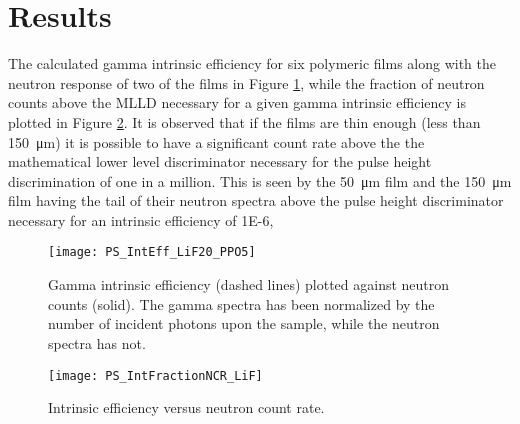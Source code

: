 \documentclass[draftcls,onecolumn]{IEEEtran}
\begin{document}
\section{Results}
\label{sec:Results}
The calculated gamma intrinsic efficiency for six polymeric films along with the neutron response of two of the films in Figure \ref{fig:GammaIntrNeutronCounts}, while the fraction of neutron counts above the MLLD necessary for a given gamma intrinsic efficiency is plotted in Figure \ref{fig:crVsIntEff}.
It is observed that if the films are thin enough (less than \SI{150}{\um}) it is possible to have a significant count rate above the the mathematical lower level discriminator necessary for the pulse height discrimination of one in a million.
This is seen by the \SI{50}{\um} film and the \SI{150}{\um} film having the tail of their neutron spectra above the pulse height discriminator necessary for an intrinsic efficiency of \num{1E-6},
\begin{figure}[ht]
    \centering
    \texttt{[image: PS\_IntEff\_LiF20\_PPO5]}
    \caption{Gamma intrinsic efficiency (dashed lines) plotted against neutron counts (solid). The gamma spectra has been normalized by the number of incident photons upon the sample, while the neutron spectra has not.}
    \label{fig:GammaIntrNeutronCounts}
\end{figure}
\begin{figure}[ht]
    \centering
    \texttt{[image: PS\_IntFractionNCR\_LiF]}
    \caption{Intrinsic efficiency versus neutron count rate. }
    \label{fig:crVsIntEff}
\end{figure}
\end{document}
